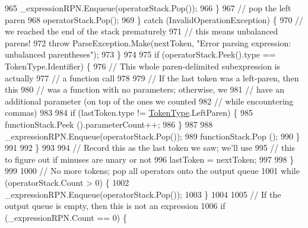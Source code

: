 \begin{DoxyCode}
965                                 \_expressionRPN.Enqueue(operatorStack.Pop());
966                             \}
967                             \textcolor{comment}{// pop the left paren}
968                             operatorStack.Pop();
969                         \} \textcolor{keywordflow}{catch} (InvalidOperationException) \{
970                             \textcolor{comment}{// we reached the end of the stack prematurely}
971                             \textcolor{comment}{// this means unbalanced parens!}
972                             \textcolor{keywordflow}{throw} ParseException.Make(nextToken, \textcolor{stringliteral}{"Error parsing expression: unbalanced
       parentheses"});
973                         \}
974 
975                         \textcolor{keywordflow}{if} (operatorStack.Peek().type == TokenType.Identifier) \{
976                             \textcolor{comment}{// This whole paren-delimited subexpression is actually}
977                             \textcolor{comment}{// a function call}
978 
979                             \textcolor{comment}{// If the last token was a left-paren, then this}
980                             \textcolor{comment}{// was a function with no parameters; otherwise, we }
981                             \textcolor{comment}{// have an additional parameter (on top of the ones we counted}
982                             \textcolor{comment}{// while encountering commas)}
983 
984                             \textcolor{keywordflow}{if} (lastToken.type != \hyperlink{a00031_a301aa7c866593a5b625a8fc158bbeace}{TokenType}.LeftParen) \{
985                                 functionStack.Peek ().parameterCount++;
986                             \}
987 
988                             \_expressionRPN.Enqueue(operatorStack.Pop());
989                             functionStack.Pop ();
990                         \}
991 
992                     \}
993 
994                     \textcolor{comment}{// Record this as the last token we saw; we'll use}
995                     \textcolor{comment}{// this to figure out if minuses are unary or not}
996                     lastToken = nextToken;
997 
998                 \}
999 
1000                 \textcolor{comment}{// No more tokens; pop all operators onto the output queue}
1001                 \textcolor{keywordflow}{while} (operatorStack.Count > 0) \{
1002                     \_expressionRPN.Enqueue(operatorStack.Pop());
1003                 \}
1004 
1005                 \textcolor{comment}{// If the output queue is empty, then this is not an expression}
1006                 \textcolor{keywordflow}{if} (\_expressionRPN.Count == 0) \{

\end{DoxyCode}
